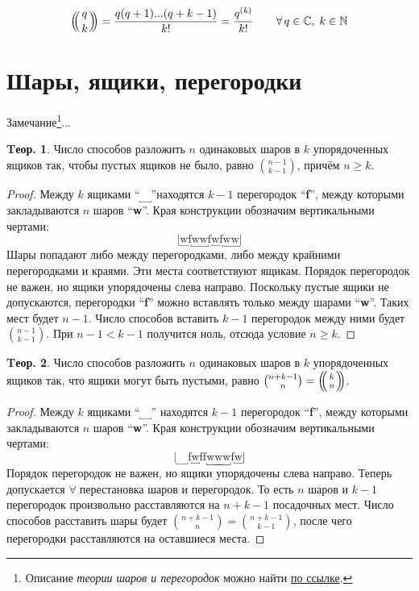 \documentclass[a4paper,12pt]{article}
\numberwithin{figure}{section}
\theoremstyle{definition}
\theoremstyle{definition}
\newtheorem{theorem}{Tеор.}[section]
\def\iiany{$\forall\;$}
\begin{document}
\[
	\mbinom{q}{k} = \frac{ q(q+1)...(q+k-1) }{k!} = \frac{ q^{(k)} }{k!}
	\qquad \forall\, q\in\mathbb{C},\; k\in\mathbb{N}
\]



\section{Шары, ящики, перегородки}

Замечание\footnote{ Описание \textit{теории шаров и перегородок} можно найти \href{http://acadclasses.narod.ru/math/lecture9.htm}{по ссылке}. }...

\def\jjc{``$\underbracket{\quad}$''}
\def\jjf{``\textbf{f}''}
\def\jjw{``\textbf{w}''}
\def\iif{\mathrm{f}}
\def\iiw{\mathrm{w}}

\begin{theorem}
	Число способов разложить $n$ одинаковых шаров в $k$ упорядоченных ящиков так, чтобы пустых ящиков не было, равно $\binom{n-1}{k-1}$, причём $n \geqslant k$.
\end{theorem}
\begin{proof}
	Между $k$ ящиками \jjc находятся $k-1$ перегородок \jjf, между которыми закладываются $n$ шаров \jjw. Края конструкции обозначим вертикальными чертами: \[ \big|
		\underbracket{\iiw} \iif \underbracket{\iiw\iiw} \iif 
		\underbracket{\iiw} \iif \underbracket{\iiw\iiw}
	\big| \]
	Шары попадают либо между перегородками, либо между крайними перегородками и краями. Эти места соответствуют ящикам.
	Порядок перегородок не важен, но ящики упорядочены слева направо.
	Поскольку пустые ящики не допускаются, перегородки \jjf \; можно вставлять только между шарами \jjw. Таких мест будет $n-1$. Число способов вставить $k-1$ перегородок между ними будет $\binom{n-1}{k-1}$. При $n-1 < k-1$ получится ноль, отсюда условие $n \geqslant k$.
\end{proof}


\begin{theorem}
	Число способов разложить $n$ одинаковых шаров в $k$ упорядоченных ящиков так, что ящики могут быть пустыми, равно $\binom{n+k-1}{n} = \mbinom{k}{n}$.
\end{theorem}
\begin{proof}
	Между $k$ ящиками \jjc \; находятся $k-1$ перегородок \jjf, между которыми закладываются $n$ шаров \jjw. Края конструкции обозначим вертикальными чертами: \[ \big|
	\underbracket{\quad} \iif \underbracket{\iiw} \iif \iif
	\underbracket{\iiw\iiw\iiw} \iif \underbracket{\iiw}
	\big| \]
	Порядок перегородок не важен, но ящики упорядочены слева направо.
	Теперь допускается \iiany перестановка шаров и перегородок. То есть $n$ шаров и $k-1$ перегородок произвольно расставляются на $n+k-1$ посадочных мест. Число способов расставить шары будет $\binom{n+k-1}{n} = \binom{n+k-1}{k-1}$, после чего перегородки расставляются на оставшиеся места.
\end{proof}
\end{document}
